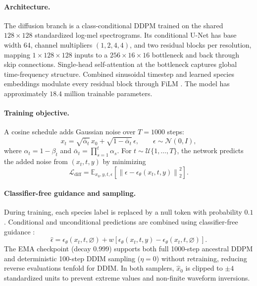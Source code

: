 \documentclass{article}
\begin{document}
\paragraph{Architecture.}
The diffusion branch is a class-conditional DDPM \cite{ho2020ddpm} trained on
the shared $128\times128$ standardized log-mel spectrograms. Its conditional
U-Net \cite{ronneberger2015unet} has base width 64, channel multipliers
$(1,2,4,4)$, and two residual blocks per resolution, mapping
$1\times128\times128$ inputs to a $256\times16\times16$ bottleneck and back
through skip connections. Single-head self-attention at the bottleneck
\cite{vaswani2017attention} captures global time-frequency structure. Combined
sinusoidal timestep and learned species embeddings modulate every residual
block through FiLM \cite{perez2018film}. The model has approximately
$18.4$ million trainable parameters.

\paragraph{Training objective.}
A cosine schedule \cite{nichol2021improved} adds Gaussian noise over $T=1000$
steps:
\begin{equation}
x_t=\sqrt{\bar{\alpha}_t}\,x_0
+\sqrt{1-\bar{\alpha}_t}\,\epsilon,\qquad
\epsilon\sim\mathcal{N}(0,I),
\label{eq:diff-forward}
\end{equation}
where $\alpha_t=1-\beta_t$ and
$\bar{\alpha}_t=\prod_{s=1}^{t}\alpha_s$. For
$t\sim\mathcal{U}\{1,\ldots,T\}$, the network predicts the added noise from
$(x_t,t,y)$ by minimizing
\begin{equation}
\mathcal{L}_{\mathrm{diff}}
=\mathbb{E}_{x_0,y,t,\epsilon}
\left[\left\|\epsilon-\epsilon_\theta(x_t,t,y)\right\|_2^2\right].
\label{eq:diff-loss}
\end{equation}

\paragraph{Classifier-free guidance and sampling.}
During training, each species label is replaced by a null token with
probability $0.1$. Conditional and unconditional predictions are combined
using classifier-free guidance \cite{ho2022cfg}:
\begin{equation}
\hat{\epsilon}
=\epsilon_\theta(x_t,t,\varnothing)
+w\!\left[\epsilon_\theta(x_t,t,y)
-\epsilon_\theta(x_t,t,\varnothing)\right].
\label{eq:cfg}
\end{equation}
The EMA checkpoint (decay 0.999) supports both full 1000-step ancestral DDPM
and deterministic 100-step DDIM sampling ($\eta=0$) \cite{song2021ddim}
without retraining, reducing reverse evaluations tenfold for DDIM. In both
samplers, $\hat{x}_0$ is clipped to $\pm4$ standardized units to prevent
extreme values and non-finite waveform inversions.
\end{document}
